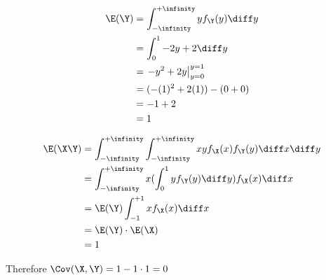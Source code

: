 \begin{align*}
\E(\Y) &= \int_{-\infinity}^{+\infinity} yf_\Y(y) \diff y\\
&= \int _0 ^1 -2y + 2 \diff y \\
&= \left. -y^2 + 2y \right|^{y=1}_{y=0} \\
&= (-(1)^2 + 2(1)) - (0 + 0) \\
&= -1 + 2 \\
&= 1
\end{align*}


\begin{align*}
\E(\X\Y) &= \int _{-\infinity} ^{+\infinity} \int _{-\infinity} ^{+\infinity} xy f_\X(x)f_\Y(y) \diff x \diff y \\
&= \int _{-\infinity} ^{+\infinity} x(\int _0 ^1 y f_\Y(y)\diff y)f_\X(x) \diff x \\
&= \E(\Y) \int _{-1} ^{+1} x f_\X(x) \diff x \\
&= \E(\Y) \cdot \E(\X) \\
&= 1
\end{align*}

Therefore $\Cov(\X, \Y) = 1 - 1 \cdot 1 = 0$

